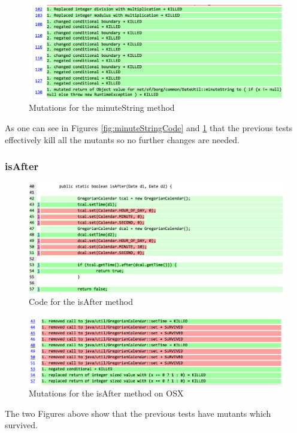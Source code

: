 \documentclass[fontsize=12pt,paper=letter,twoside]{scrartcl}
\begin{document}
\begin{figure}[H]
\begin{center}
\includegraphics[width=.99\textwidth]{images/MutationTesting/minuteStringMutant.png}
\end{center}
\caption{Mutations for the minuteString method}
\label{fig:minuteStringMutant}
\end{figure}

As one can see in Figures \ref{fig:minuteStringCode} and \ref{fig:minuteStringMutant} that the previous tests effectively kill all the mutants so no further changes are needed.

\subsubsection{isAfter}
\begin{figure}[H]
\begin{center}
\includegraphics[width=.99\textwidth]{images/MutationTesting/isAfterCode.png}
\end{center}
\caption{Code for the isAfter method}
\label{fig:isAfterCode}
\end{figure}

\begin{figure}[H]
\begin{center}
\includegraphics[width=.99\textwidth]{images/MutationTesting/isAfterMutant.png}
\end{center}
\caption{Mutations for the isAfter method on OSX}
\label{fig:isAfterMutant}
\end{figure}
\setlength\intextsep{0pt}
The two Figures above show that the previous tests have mutants which survived.
\end{document}
